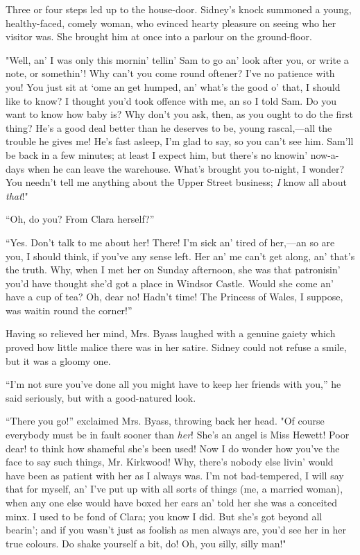 Three or four steps led up to the house-door. Sidney's knock summoned a
young, healthy-faced, comely woman, who evinced hearty pleasure on
seeing who her visitor was. She brought him at once into a parlour on
the ground-floor.

"Well, an' I was only this mornin' tellin' Sam to go an' look after you,
or write a note, or somethin'! Why can't you come round oftener? I've no
patience with you! You just sit at `ome an get humped, an' what's the
good o' that, I should like to know? I thought you'd took offence with
me, an so I told Sam. Do you want to know how baby is? Why don't you
ask, then, as you ought to do the first thing? He's a good deal better
than he deserves to be, young rascal,---all the trouble he gives me!
He's fast {}asleep, I'm glad to say, so you can't see him. Sam'll be
back in a few minutes; at least I expect him, but there's no knowin'
now-a-days when he can leave the warehouse. What's brought you to-night,
I wonder? You needn't tell me anything about the Upper Street business;
\emph{I} know all about \emph{that}!"

``Oh, do you? From Clara herself?''

``Yes. Don't talk to me about her! There! I'm sick an' tired of
her,---an so are you, I should think, if you've any sense left. Her an'
me can't get along, an' that's the truth. Why, when I met her on Sunday
afternoon, she was that patronisin' you'd have thought she'd got a place
in Windsor Castle. Would she come an' have a cup of tea? Oh, dear no!
Hadn't time! The Princess of Wales, I suppose, was waitin round the
corner!''

Having so relieved her mind, Mrs. Byass laughed with a genuine gaiety
which proved how little malice there was in her satire. Sidney could not
refuse a smile, but it was a gloomy one.

{}``I'm not sure you've done all you might have to keep her friends with
you,'' he said seriously, but with a good-natured look.

``There you go!'' exclaimed Mrs. Byass, throwing back her head. "Of
course everybody must be in fault sooner than \emph{her}! She's an angel
is Miss Hewett! Poor dear! to think how shameful she's been used! Now I
do wonder how you've the face to say such things, Mr. Kirkwood! Why,
there's nobody else livin' would have been as patient with her as I
always was. I'm not bad-tempered, I will say that for myself, an' I've
put up with all sorts of things (me, a married woman), when any one else
would have boxed her ears an' told her she was a conceited minx. I used
to be fond of Clara; you know I did. But she's got beyond all bearin';
and if you wasn't just as foolish as men always are, you'd see her in
her true colours. Do shake yourself a bit, do! Oh, you silly, silly
man!"

